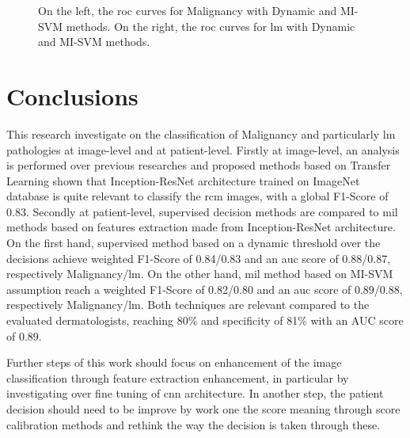 \documentclass[journal,article,submit,moreauthors,pdftex, applsci]{Definitions/mdpi}
\begin{document}
\begin{figure}[H]
    \caption{On the left, the \ac{roc} curves for Malignancy with Dynamic and MI-SVM methods. On the right, the \ac{roc} curves for \ac{lm} with Dynamic and MI-SVM methods.}
    \label{fig:roc_results}
\end{figure}

\section{Conclusions}
\label{sec:conclusions}
This research investigate on the classification of Malignancy and particularly \ac{lm} pathologies at image-level and at patient-level. Firstly at image-level, an analysis is performed over previous researches and proposed methods based on Transfer Learning shown that Inception-ResNet architecture trained on ImageNet database is quite relevant to classify the \ac{rcm} images, with a global F1-Score of 0.83. Secondly at patient-level, supervised decision methods are compared to \ac{mil} methods based on features extraction made from Inception-ResNet architecture. On the first hand, supervised method based on a dynamic threshold over the decisions achieve weighted F1-Score of 0.84/0.83 and an \ac{auc} score of 0.88/0.87, respectively Malignancy/\ac{lm}. On the other hand, \ac{mil} method based on MI-SVM assumption reach a weighted F1-Score of 0.82/0.80 and an \ac{auc} score of 0.89/0.88, respectively Malignancy/\ac{lm}. Both techniques are relevant compared to the evaluated dermatologists, reaching 80\% and specificity of 81\% with an AUC score of 0.89.\par
Further steps of this work should focus on enhancement of the image classification through feature extraction enhancement, in particular by investigating over fine tuning of \ac{cnn} architecture. In another step, the patient decision should need to be improve by work  one the score meaning through score calibration methods and rethink the way the decision is taken through these.\par

\vspace{6pt} 


\end{document}
